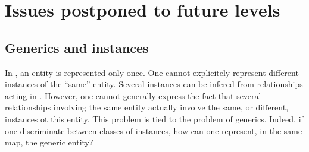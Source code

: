 \chapter{Issues postponed to future levels}\label{sec:postponed}

\section{Generics and instances}\label{sec:instances}

In \SBGNERLone, an entity is represented only once. One cannot explicitely represent different instances of the ``same'' entity. Several instances can be infered from relationships acting in . However, one cannot generally express the fact that several relationships involving the same entity actually involve the same, or different, instances ot this entity. This problem is tied to the problem of generics. Indeed, if one discriminate between classes of instances, how can one represent, in the same map, the generic entity?